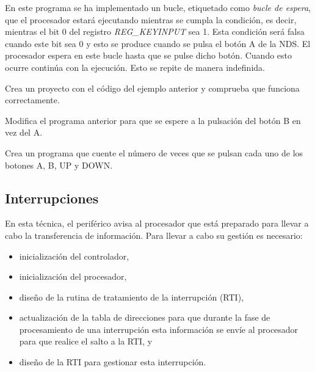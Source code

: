 En este programa se ha implementado un  bucle, etiquetado como \textit{bucle de espera}, que el procesador estará ejecutando  mientras se cumpla la condición, es decir, mientras el bit 0 del registro \textit{REG\_KEYINPUT} sea 1. Esta condición será falsa cuando este bit sea 0 y esto se produce cuando se pulsa el botón A de la NDS. El procesador espera en este bucle hasta que se pulse dicho botón. Cuando esto ocurre contin\'ua con la ejecución. Esto se repite de manera indefinida.

\begin{exercise}
Crea un proyecto con el código del ejemplo anterior y comprueba que funciona correctamente.
\end{exercise}

\begin{exercise}
Modifica el programa anterior para que se espere a la pulsación del botón B en vez del A.
\end{exercise}

\begin{exercise}
Crea un programa que cuente el número de veces que se pulsan cada uno de los botones A, B, UP y DOWN.
\end{exercise}

\subsection{Interrupciones}
En esta técnica, el periférico avisa al procesador que está preparado para llevar a cabo la transferencia de información. Para llevar a cabo su gestión es necesario:

\begin{itemize}
	\item  inicialización del controlador, 
	\item  inicialización del  procesador, 
	\item diseño de la rutina de tratamiento de la interrupción (RTI), 
	\item actualización  de la tabla de direcciones para que durante la fase de procesamiento de una interrupción esta información se envíe al procesador para que realice el salto a la RTI, y 
	\item diseño de la RTI para gestionar esta interrupción.
\end{itemize}

